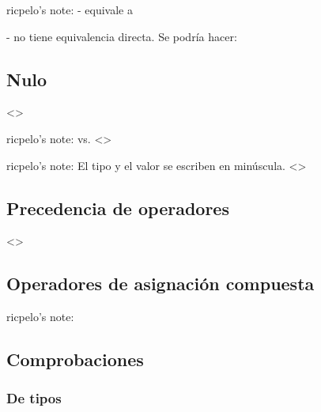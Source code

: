 \documentclass[a4paper,12pt,spanish]{sphinxmanual}
\begin{document}
\begin{DUlineblock}{0em}
\item[] ricpelo’s note: -  equivale a 
\item[] -  no tiene equivalencia directa. Se podría hacer:
\item[] 
\end{DUlineblock}


\subsection{Nulo}
\label{\detokenize{php:nulo}}
\textless{}\textgreater{}

\begin{DUlineblock}{0em}
\item[] ricpelo’s note:  vs.
 \textless{}\textgreater{}
\item[] ricpelo’s note: El tipo  y el valor  se escriben en
minúscula. \textless{}\textgreater{}
\end{DUlineblock}


\subsection{Precedencia de operadores}
\label{\detokenize{php:precedencia-de-operadores}}
\textless{}\textgreater{}


\subsection{Operadores de asignación compuesta}
\label{\detokenize{php:operadores-de-asignacion-compuesta}}
ricpelo’s note:  


\subsection{Comprobaciones}
\label{\detokenize{php:comprobaciones}}

\subsubsection{De tipos}
\label{\detokenize{php:de-tipos}}
\end{document}
